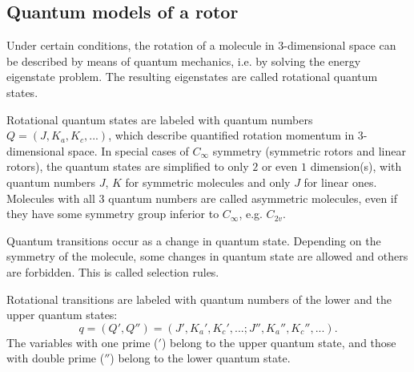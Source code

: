 \documentclass[11pt]{article}
\begin{document}



\subsection{Quantum models of a rotor}

Under certain conditions, the rotation of a molecule in $3$-dimensional space can be described by means of quantum mechanics, i.e. by solving the energy eigenstate problem. The resulting eigenstates are called rotational quantum states. 

Rotational quantum states are labeled with quantum numbers $Q = (J, {K_a}, {K_c}, ...)$, which describe quantified rotation momentum in $3$-dimensional space. In special cases of $C_{\infty}$ symmetry (symmetric rotors and linear rotors), the quantum states  are simplified to only $2$ or even $1$ dimension(s), with  quantum numbers $J$, $K$ for symmetric molecules and only $J$ for linear ones. Molecules with all $3$ quantum numbers are called asymmetric molecules, even if they have some symmetry group inferior to $C_{\infty}$, e.g. $C_{2v}$. 

Quantum transitions occur as a change in quantum state. Depending on the symmetry of the molecule, some changes in quantum state are allowed and others are forbidden. This is called selection rules.

Rotational transitions are labeled with quantum numbers of the lower and the upper quantum states:
\begin{equation} 
\label{quantum_numbers}
q = (Q', Q'') = (J', {K_a}', {K_c}', ...; J'', {K_a}'', {K_c}'', ...).
\end{equation}
The variables with one prime ($'$) belong to the upper quantum state, and those with double prime ($''$) belong to the lower quantum state. 
\end{document}
